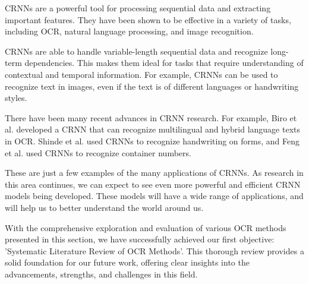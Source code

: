 CRNNs are a powerful tool for processing sequential data and extracting important features. They have been shown to be effective in a variety of tasks, including OCR, natural language processing, and image recognition.

CRNNs are able to handle variable-length sequential data and recognize long-term dependencies. This makes them ideal for tasks that require understanding of contextual and temporal information. For example, CRNNs can be used to recognize text in images, even if the text is of different languages or handwriting styles.

There have been many recent advances in CRNN research. For example, Biro et al. developed a CRNN that can recognize multilingual and hybrid language texts in OCR. Shinde et al. used CRNNs to recognize handwriting on forms, and Feng et al. used CRNNs to recognize container numbers.

These are just a few examples of the many applications of CRNNs. As research in this area continues, we can expect to see even more powerful and efficient CRNN models being developed. These models will have a wide range of applications, and will help us to better understand the world around us.

With the comprehensive exploration and evaluation of various OCR methods presented in this section, we have successfully achieved our first objective: 'Systematic Literature Review of OCR Methods'. This thorough review provides a solid foundation for our future work, offering clear insights into the advancements, strengths, and challenges in this field.
